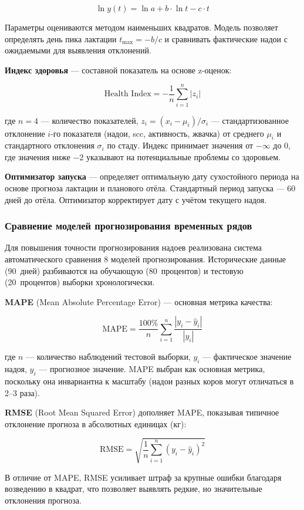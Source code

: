 $$\ln y(t) = \ln a + b \cdot \ln t - c \cdot t$$

Параметры оцениваются методом наименьших квадратов. Модель позволяет определять день пика лактации $t_{\max} = -b/c$ и сравнивать фактические надои с ожидаемыми для выявления отклонений.

\textbf{Индекс здоровья} --- составной показатель на основе z-оценок:

$$\text{Health Index} = -\frac{1}{n} \sum_{i=1}^{n} \left|z_i\right|$$

где $n = 4$ --- количество показателей, $z_i = (x_i - \mu_i) / \sigma_i$ --- стандартизованное отклонение $i$-го показателя (надои, \acrshort{scc}, активность, жвачка) от среднего $\mu_i$ и стандартного отклонения $\sigma_i$ по стаду. Индекс принимает значения от $-\infty$ до 0, где значения ниже $-2$ указывают на потенциальные проблемы со здоровьем.

\textbf{Оптимизатор запуска} --- определяет оптимальную дату сухостойного периода на основе прогноза лактации и планового отёла. Стандартный период запуска --- 60 дней до отёла. Оптимизатор корректирует дату с учётом текущего надоя.

\subsubsection{Сравнение моделей прогнозирования временных рядов}

Для повышения точности прогнозирования надоев реализована система автоматического сравнения 8 моделей прогнозирования. Исторические данные (90~дней) разбиваются на обучающую (80~процентов) и тестовую (20~процентов) выборки хронологически.

\textbf{MAPE} (Mean Absolute Percentage Error) --- основная метрика качества:

$$\text{MAPE} = \frac{100\%}{n} \sum_{i=1}^{n} \frac{|y_i - \hat{y}_i|}{|y_i|}$$

где $n$ --- количество наблюдений тестовой выборки, $y_i$ --- фактическое значение надоя, $\hat{y}_i$ --- прогнозное значение. MAPE выбран как основная метрика, поскольку она инвариантна к масштабу (надои разных коров могут отличаться в 2--3 раза).

\textbf{RMSE} (Root Mean Squared Error) дополняет MAPE, показывая типичное отклонение прогноза в абсолютных единицах (кг):

$$\text{RMSE} = \sqrt{\frac{1}{n} \sum_{i=1}^{n} (y_i - \hat{y}_i)^2}$$

В отличие от MAPE, RMSE усиливает штраф за крупные ошибки благодаря возведению в квадрат, что позволяет выявлять редкие, но значительные отклонения прогноза.

